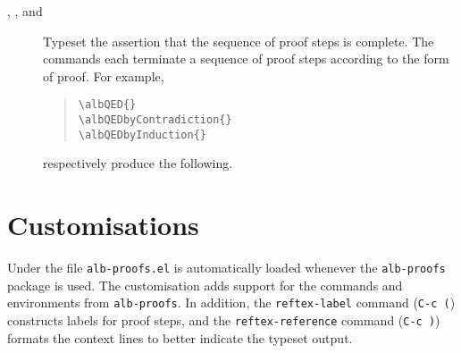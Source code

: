 \documentclass[11pt,a4paper,oneside,titlepage]{alb-corp}
\begin{document}
\begin{description}
\item[, , and
  ] Typeset the assertion that the sequence
  of proof steps is complete.  The commands each terminate a sequence of
  proof steps according to the form of proof.  For example,
  \begin{quote}
\begin{verbatim}
\albQED{}
\albQEDbyContradiction{}
\albQEDbyInduction{}
\end{verbatim}
  \end{quote}
  respectively produce the following.
  \begin{quote}
    \albQED{}
    \albQEDbyContradiction{}
    \albQEDbyInduction{}
  \end{quote}
\end{description}




\section{\AUCTeX{} Customisations}
\label{sec:alb-proofs-documentation:auctex-cust}

Under \AUCTeX{} the file \texttt{alb-proofs.el} is automatically loaded
whenever the \texttt{alb-proofs} package is used.  The customisation
adds support for the commands and environments from \texttt{alb-proofs}.
In addition, the \texttt{reftex-label} command (\texttt{C-c (})
constructs labels for proof steps, and the \texttt{reftex-reference}
command (\texttt{C-c )}) formats the context lines to better indicate
the typeset output.






\end{document}
